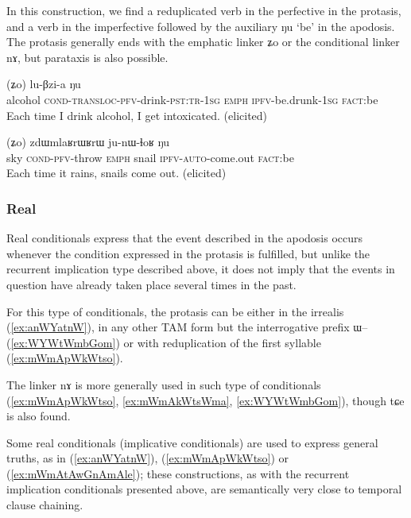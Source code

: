 \documentclass[oldfontcommands,oneside,a4paper,11pt]{article}
\newcommand{\ipa}[1]{{\phon \mbox{#1}}} %
\newcommand{\refb}[1]{(\ref{#1})}
\begin{document}
In this construction, we find a reduplicated verb in the perfective  in the protasis, and a verb in the imperfective followed by the auxiliary \ipa{ŋu} `be'   in the apodosis. The protasis generally ends with the emphatic linker \ipa{ʑo} or the conditional linker \ipa{nɤ}, but parataxis is also possible.

     \begin{exe}
   \ex \label{ex:CWCkAtshita}
   \gll
[\ipa{cʰa}   	\textbf{\ipa{ɕɯ-ɕ-kɤ-tsʰi-t-a}}]   	(\ipa{ʑo})   	\ipa{lu-βzi-a}   	\ipa{ŋu}   \\
alcohol \textsc{cond-transloc-pfv}-drink-\textsc{pst:tr-1sg} \textsc{emph} \textsc{ipfv}-be.drunk-\textsc{1sg} \textsc{fact}:be\\
\glt Each time I drink alcohol, I get intoxicated. (elicited)
\end{exe}

     \begin{exe}
   \ex \label{ex:tWmW.kWkAlAt}
   \gll
[\ipa{tɯmɯ}   \textbf{	\ipa{kɯ-kɤ-lɤt}}]   	(\ipa{ʑo})   	\ipa{zdɯmlaʁrɯʁrɯ}   	\ipa{ju-nɯ-ɬoʁ}   	\ipa{ŋu}   \\
sky \textsc{cond-pfv}-throw \textsc{emph} snail \textsc{ipfv-auto}-come.out \textsc{fact}:be\\
\glt Each time it rains,  snails come out. (elicited)
\end{exe}

\subsubsection{Real} \label{sec:real.conditional}
Real conditionals express that the event described in the apodosis occurs whenever the condition expressed in the protasis is fulfilled, but unlike the recurrent implication type described above, it does not imply that the events in question have already taken place several times in the past.

For this type of conditionals, the protasis can be either in the irrealis \refb{ex:anWYatnW}, in any other TAM form but the interrogative prefix \ipa{ɯ}-- \refb{ex:WYWtWmbGom} or with reduplication of the first syllable \refb{ex:mWmApWkWtso}. 


The linker \ipa{nɤ} is more generally used in such type of conditionals (\ref{ex:mWmApWkWtso}, \ref{ex:mWmAkWtsWma}, \ref{ex:WYWtWmbGom}), though \ipa{tɕe} is also found.


Some  real conditionals (implicative conditionals) are used to express general truths, as in \refb{ex:anWYatnW}, \refb{ex:mWmApWkWtso} or \refb{ex:mWmAtAwGnAmAle}; these constructions, as with the recurrent implication conditionals presented above, are semantically very close to temporal clause chaining. 
\end{document}

